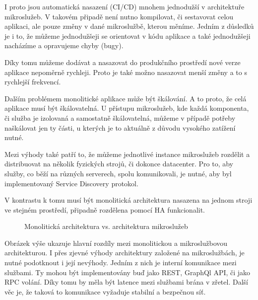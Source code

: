\documentclass[thesis=M,czech]{FITthesis}[2019/12/23]
\theoremstyle{plain}
\theoremstyle{definition}
\begin{document}
I proto jsou automatická nasazení (CI/CD) mnohem jednodužší v architektuře mikroslužeb. V takovém připadě není nutno kompilovat, či sestavovat celou aplikaci, ale pouze změny v dané mikroslužbě, kterou měníme. Jedním z důsledků je i to, že můžeme jednodužšeji se orientovat v kódu aplikace a také jednodužšeji nacházíme a opravujeme chyby (bugy).

Díky tomu můžeme dodávat a nasazovat do produkčního prostředí nové verze aplikace nepoměrně rychleji. Proto je také možno nasazovat menší změny a to s rychlejší frekvencí. 

Dalším problémem monolitické aplikace může být škálování. A to proto, že celá aplikace musí být škálovatelná. U přístupu mikroslužeb, kde každá komponenta, či služba je izolovaná a samostatně škálovatelná, můžeme v případě potřeby naškálovat jen ty části, u kterých je to aktuálně z důvodu vysokého zatížení nutné.

Mezi výhody také patří to, že můžeme jednotlivé instance mikroslužeb rozdělit a distribuovat na několik fyzických strojů, či dokonce datacenter. Pro to, aby služby, co běží na různých serverech, spolu komunikovali, je nutné, aby byl implementovaný Service Discovery protokol. 

V kontrastu k tomu musí být monolitická architektura nasazena na jednom stroji ve stejném prostředí, připadně rozdělena pomocí HA funkcionalit.


\begin{figure}[H]\centering
	

	\caption[Příklad obrázku]{Monolitická architektura vs. architektura mikroslužeb}\label{fig:float}
\end{figure}


Obrázek výše ukazuje hlavní rozdíly mezi monolitickou a mikroslužbovou architekturou. I přes zjevné výhody architektury založené na mikroslužbách, je nutné podotknout i její nevýhody. Jedním z nich je interní komunikace mezi službami. Ty mohou být implementovány buď jako REST, GraphQl API, či jako RPC volání. Díky tomu by měla být latence mezi službami brána v zřetel. Další věc je, že taková to komunikace vyžaduje stabilní a bezpečnou síť.
\end{document}

